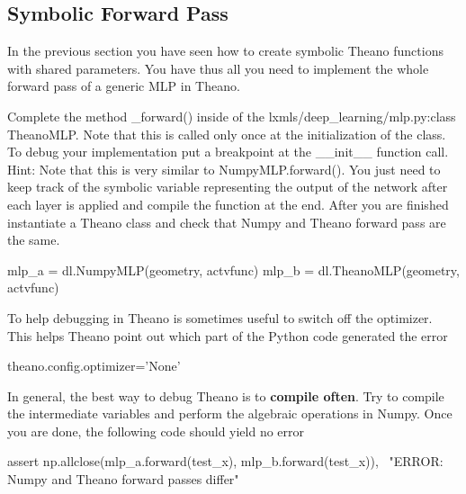 \subsection{Symbolic Forward Pass}
In the previous section you have seen how to create symbolic Theano functions
with shared parameters. You have thus all you need to implement the whole
forward pass of a generic MLP in Theano.
\begin{exercise}
Complete the method \_forward() inside of the lxmls/deep\_learning/mlp.py:class
TheanoMLP. Note that this is called only once at the initialization of the
class. To debug your implementation put a breakpoint at the \_\_init\_\_
function call. Hint: Note that this is very similar to NumpyMLP.forward().
You just need to keep track of the symbolic variable representing the output of
the network after each layer is applied and compile the function at the end.
After you are finished instantiate a Theano class and check that Numpy and
Theano forward pass are the same. 

\begin{python}
mlp_a = dl.NumpyMLP(geometry, actvfunc)
mlp_b = dl.TheanoMLP(geometry, actvfunc)
\end{python}

To help debugging in Theano is sometimes useful to switch off the optimizer.
This helps Theano point out which part of the Python code generated the error
\begin{python}
theano.config.optimizer='None'
\end{python}
In general, the best way to debug Theano is to \textbf{compile often}. Try to
compile the intermediate variables and perform the algebraic operations in
Numpy. Once you are done, the following code should yield no error

\begin{python}
assert np.allclose(mlp_a.forward(test_x), mlp_b.forward(test_x)), \
    "ERROR: Numpy and Theano forward passes differ"
\end{python}
\end{exercise}

